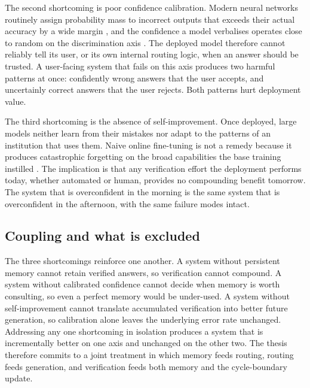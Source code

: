The second shortcoming is poor confidence calibration. Modern neural networks routinely assign probability mass to incorrect outputs that exceeds their actual accuracy by a wide margin \cite{pmlr-v70-guo17a}, and the confidence a model verbalises operates close to random on the discrimination axis \cite{xiong2023can}. The deployed model therefore cannot reliably tell its user, or its own internal routing logic, when an answer should be trusted. A user-facing system that fails on this axis produces two harmful patterns at once: confidently wrong answers that the user accepts, and uncertainly correct answers that the user rejects. Both patterns hurt deployment value.

The third shortcoming is the absence of self-improvement. Once deployed, large models neither learn from their mistakes nor adapt to the patterns of an institution that uses them. Naive online fine-tuning is not a remedy because it produces catastrophic forgetting on the broad capabilities the base training instilled \cite{doi:10.1073/pnas.1611835114}. The implication is that any verification effort the deployment performs today, whether automated or human, provides no compounding benefit tomorrow. The system that is overconfident in the morning is the same system that is overconfident in the afternoon, with the same failure modes intact.

\subsection{Coupling and what is excluded}
\label{sec:coupling-exclusions}

The three shortcomings reinforce one another. A system without persistent memory cannot retain verified answers, so verification cannot compound. A system without calibrated confidence cannot decide when memory is worth consulting, so even a perfect memory would be under-used. A system without self-improvement cannot translate accumulated verification into better future generation, so calibration alone leaves the underlying error rate unchanged. Addressing any one shortcoming in isolation produces a system that is incrementally better on one axis and unchanged on the other two. The thesis therefore commits to a joint treatment in which memory feeds routing, routing feeds generation, and verification feeds both memory and the cycle-boundary update.

